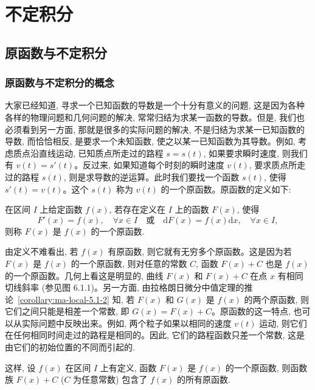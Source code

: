 \setcounter{chapter}{5} %
\chapter{不定积分}
\label{chap:ma-6}

\section{原函数与不定积分}
\label{sec:ma-6-1}

\subsection{原函数与不定积分的概念}
\label{subsec:ma-6-1-1}

大家已经知道, 寻求一个已知函数的导数是一个十分有意义的问题, 这是因为各种各样的物理问题和几何问题的解决, 常常归结为求某一函数的导数。但是, 我们也必须看到另一方面, 那就是很多的实际问题的解决, 不是归结为求某一已知函数的导数, 而恰恰相反, 是要求一个未知函数, 使之以某一已知函数为其导数。例如, 考虑质点沿直线运动, 已知质点所走过的路程 $s=s(t)$, 如果要求瞬时速度, 则我们有 $v(t)=s'(t)$。反过来, 如果知道每个时刻的瞬时速度 $v(t)$, 要求质点所走过的路程 $s(t)$, 则是求导数的逆运算。此时我们要找一个函数 $s(t)$, 使得 $s'(t)=v(t)$。这个 $s(t)$ 称为 $v(t)$ 的一个原函数。原函数的定义如下:

\begin{definition}\label{definition:ma-6-1-1}
在区间 $I$ 上给定函数 $f(x)$, 若存在定义在 $I$ 上的函数 $F(x)$, 使得
\[
  F'(x)=f(x),\quad \forall x\in I
  \quad\text{或}\quad
  \mathrm dF(x)=f(x)\mathrm dx,\quad \forall x\in I,
\]
则称 $F(x)$ 是 $f(x)$ 的一个原函数.
\end{definition}

由定义不难看出, 若 $f(x)$ 有原函数, 则它就有无穷多个原函数。这是因为若 $F(x)$ 是 $f(x)$ 的一个原函数, 则对任意的常数 $C$, 函数 $F(x)+C$ 也是 $f(x)$ 的一个原函数。几何上看这是明显的, 曲线 $F(x)$ 和 $F(x)+C$ 在点 $x$ 有相同切线斜率 (参见图 6.1.1)。另一方面, 由拉格朗日微分中值定理的推论~\ref{corollary:ma-local-5.1-2} 知, 若 $F(x)$ 和 $G(x)$ 是 $f(x)$ 的两个原函数, 则它们之间只能是相差一个常数, 即 $G(x)=F(x)+C$。原函数的这一特点, 也可以从实际问题中反映出来。例如, 两个粒子如果以相同的速度 $v(t)$ 运动, 则它们在任何相同时间走过的路程是相同的。因此, 它们的路程函数只差一个常数, 这是由它们的初始位置的不同而引起的.

这样, 设 $f(x)$ 在区间 $I$ 上有定义, 函数 $F(x)$ 是 $f(x)$ 的一个原函数, 则函数族 $F(x)+C$ ($C$ 为任意常数) 包含了 $f(x)$ 的所有原函数.

